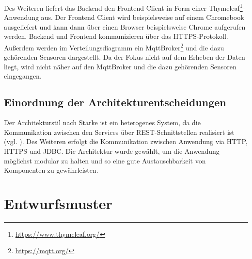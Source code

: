 \documentclass[runningheads]{llncs}
\begin{document}
Des Weiteren liefert das Backend den Frontend Client in Form einer Thymeleaf\footnote{\url{https://www.thymeleaf.org/}}-Anwendung aus.
Der Frontend Client wird beispielsweise auf einem Chromebook ausgeliefert und kann dann über einen Browser beispielsweise Chrome aufgerufen werden.
Backend und Frontend kommunizieren über das HTTPS-Protokoll.
Außerdem werden im Verteilungsdiagramm ein MqttBroker\footnote{\url{https://mqtt.org/}} und die dazu gehörenden Sensoren dargestellt.
Da der Fokus nicht auf dem Erheben der Daten liegt, wird nicht näher auf den MqttBroker und die dazu gehörenden Sensoren eingegangen.

\subsection{Einordnung der Architekturentscheidungen}
Der Architekturstil nach Starke ist ein heterogenes System, da die Kommunikation zwischen den Services über REST-Schnittstellen realisiert ist (vgl. \cite{starke2015effektive}).
Des Weiteren erfolgt die Kommunikation zwischen Anwendung via HTTP, HTTPS und JDBC.
Die Architektur wurde gewählt, um die Anwendung möglichst modular zu halten und so eine gute Austauschbarkeit von Komponenten zu gewährleisten.

\newpage
\section{Entwurfsmuster}
\end{document}
